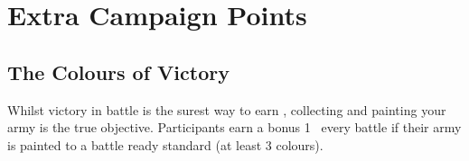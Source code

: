 \section{Extra Campaign Points}

\subsection{The Colours of Victory}

Whilst victory in battle is the surest way to earn \CPshort, collecting and painting your army is the true objective. Participants earn a bonus 1~\CPshort{} every battle if their army is painted to a battle ready standard (at least 3 colours).